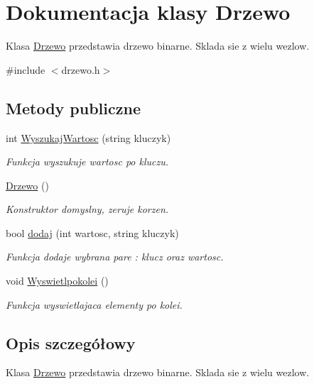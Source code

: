 \hypertarget{class_drzewo}{\section{Dokumentacja klasy Drzewo}
\label{class_drzewo}
}


Klasa \hyperlink{class_drzewo}{Drzewo} przedstawia drzewo binarne. Sklada sie z wielu wezlow.  




{\ttfamily \#include $<$drzewo.\-h$>$}

\subsection*{Metody publiczne}
\begin{DoxyCompactItemize}
\item 
int \hyperlink{class_drzewo_a3cc4b6778603a1bb0d98c4435d5cf068}{Wyszukaj\-Wartosc} (string kluczyk)
\begin{DoxyCompactList}\small\item\em Funkcja wyszukuje wartosc po kluczu. \end{DoxyCompactList}\item 
\hyperlink{class_drzewo_a309a5197b6a02c761f046fc99136eebb}{Drzewo} ()
\begin{DoxyCompactList}\small\item\em Konstruktor domyslny, zeruje korzen. \end{DoxyCompactList}\item 
bool \hyperlink{class_drzewo_a50373a0a15637acc4e8f961b1a53cb37}{dodaj} (int wartosc, string kluczyk)
\begin{DoxyCompactList}\small\item\em Funkcja dodaje wybrana pare \-: klucz oraz wartosc. \end{DoxyCompactList}\item 
void \hyperlink{class_drzewo_a3d58680a7f5d118119ca564c6a4b1018}{Wyswietlpokolei} ()
\begin{DoxyCompactList}\small\item\em Funkcja wyswietlajaca elementy po kolei. \end{DoxyCompactList}\end{DoxyCompactItemize}


\subsection{Opis szczegółowy}
Klasa \hyperlink{class_drzewo}{Drzewo} przedstawia drzewo binarne. Sklada sie z wielu wezlow. 

